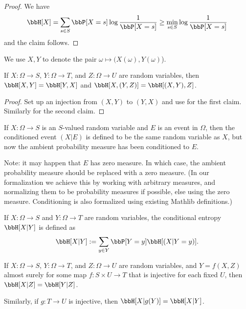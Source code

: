 \begin{proof}
  \leanok
  We have
  $$ \bbH[X] = \sum_{s \in S} \bbP[X=s] \log \frac{1}{\bbP[X=s]} \geq \min_{s \in S} \log \frac{1}{\bbP[X=s]}$$
  and the claim follows.
\end{proof}

We use $X,Y$ to denote the pair $\omega \mapsto (X(\omega),Y(\omega)$).

\begin{lemma}
  \label{entropy-comm}
  \leanok
  If $X: \Omega \to S$, $Y: \Omega \to T$, and $Z: \Omega \to U$ are random variables, then $\bbH[X, Y] = \bbH[Y, X]$ and $\bbH[X, (Y,Z)] = \bbH[(X,Y), Z]$.
\end{lemma}
\begin{proof}
  \leanok
  Set up an injection from $(X,Y)$ to $(Y,X)$ and use  for the first claim. Similarly for the second claim.
\end{proof}


\begin{definition}
  \label{condition-event-def}
  \leanok
  If $X: \Omega \to S$ is an $S$-valued random variable and $E$ is an event in $\Omega$, then the conditioned event $(X|E)$ is defined to be the same random variable as $X$, but now the ambient probability measure has been conditioned to $E$.
\end{definition}

Note: it may happen that $E$ has zero measure.  In which case, the ambient probability measure should be replaced with a zero measure.  (In our formalization we achieve this by working with arbitrary measures, and normalizing them to be probability measures if possible, else using the zero measure.  Conditioning is also formalized using existing Mathlib definitions.)

\begin{definition}
  \label{conditional-entropy-def}
  \leanok
  If $X: \Omega \to S$ and $Y: \Omega \to T$ are random variables, the conditional entropy $\bbH[X|Y]$ is defined as
  $$ \bbH[X|Y] := \sum_{y \in Y} \bbP[Y = y] \bbH[(X | Y=y)].$$
\end{definition}

\begin{lemma}\label{relabeled-entropy-cond}
  \leanok
  If $X: \Omega \to S$, $Y: \Omega \to T$, and $Z: \Omega \to U$ are random variables, and $Y = f(X,Z)$ almost surely for some map $f: S \times U \to T$ that is injective for each fixed $U$, then $\bbH[X|Z] = \bbH[Y|Z]$.

  Similarly, if $g: T \to U$ is injective, then $\bbH[X|g(Y)] = \bbH[X|Y]$.
\end{lemma}

